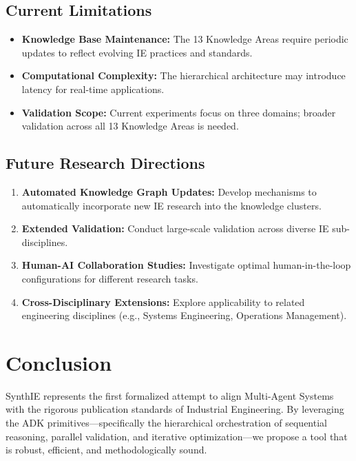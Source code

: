 \documentclass[12pt,a4paper]{article}
\begin{document}
\subsection{Current Limitations}

\begin{itemize}[leftmargin=*]
    \item \textbf{Knowledge Base Maintenance:} The 13 Knowledge Areas require periodic updates to reflect evolving IE practices and standards.
    \item \textbf{Computational Complexity:} The hierarchical architecture may introduce latency for real-time applications.
    \item \textbf{Validation Scope:} Current experiments focus on three domains; broader validation across all 13 Knowledge Areas is needed.
\end{itemize}

\subsection{Future Research Directions}

\begin{enumerate}[leftmargin=*]
    \item \textbf{Automated Knowledge Graph Updates:} Develop mechanisms to automatically incorporate new IE research into the knowledge clusters.
    \item \textbf{Extended Validation:} Conduct large-scale validation across diverse IE sub-disciplines.
    \item \textbf{Human-AI Collaboration Studies:} Investigate optimal human-in-the-loop configurations for different research tasks.
    \item \textbf{Cross-Disciplinary Extensions:} Explore applicability to related engineering disciplines (e.g., Systems Engineering, Operations Management).
\end{enumerate}

\section{Conclusion}

SynthIE represents the first formalized attempt to align Multi-Agent Systems with the rigorous publication standards of Industrial Engineering. By leveraging the ADK primitives—specifically the hierarchical orchestration of sequential reasoning, parallel validation, and iterative optimization—we propose a tool that is robust, efficient, and methodologically sound.
\end{document}
